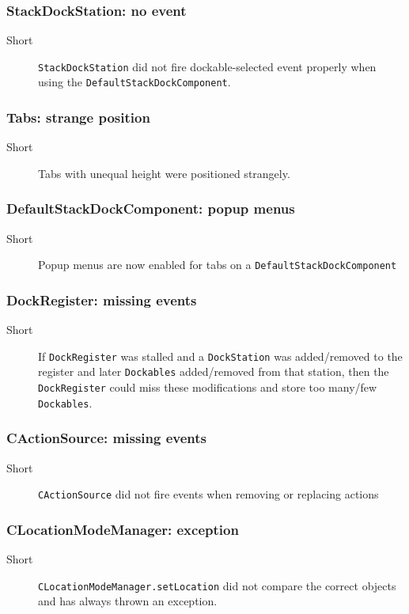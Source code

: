 \documentclass[a4paper,10pt]{article}
\newcommand{\src}[1]{\lstinline[basicstyle=\normalsize\ttfamily,keywordstyle=\normalsize\ttfamily,identifierstyle=\normalsize\ttfamily]|#1|}
\newcommand{\short}{\item[Short]}
\begin{document}
\subsubsection{StackDockStation: no event}
\begin{description}
 \short \src{StackDockStation} did not fire dockable-selected event properly when using the \src{DefaultStackDockComponent}.
\end{description}

\subsubsection{Tabs: strange position}
\begin{description}
 \short Tabs with unequal height were positioned strangely.
\end{description}

\subsubsection{DefaultStackDockComponent: popup menus}
\begin{description}
 \short Popup menus are now enabled for tabs on a \linebreak \src{DefaultStackDockComponent}
\end{description}

\subsubsection{DockRegister: missing events}
\begin{description}
 \short If \src{DockRegister} was stalled and a \src{DockStation} was added/removed to the register and later \src{Dockables} added/removed from that station, then the \src{DockRegister} could miss these modifications and store too many/few \src{Dockables}.
\end{description}


\subsubsection{CActionSource: missing events}
\begin{description}
 \short \src{CActionSource} did not fire events when removing or replacing actions
\end{description}
 
\subsubsection{CLocationModeManager: exception}
\begin{description}
 \short \src{CLocationModeManager.setLocation} did not compare the correct objects and has always thrown an exception.
\end{description}
\end{document}
